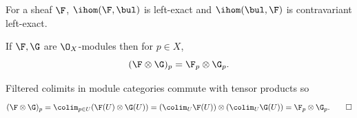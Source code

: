 \eproof

\bcoro

    For a sheaf $\F$, $\ihom(\F,\bul)$ is left-exact and $\ihom(\bul,\F)$ is contravariant left-exact.

\ecoro

\bprop

    If $\F,\G$ are $\O_X$-modules then for $p\in X$,
    $$ (\F\otimes\G)_p = \F_p\otimes\G_p . $$

\eprop

\bproof

    Filtered colimits in module categories commute with tensor products so
    $$ (\F\otimes\G)_p = \colim_{p\in U}(\F(U)\otimes\G(U)) = (\colim_U\F(U))\otimes(\colim_U\G(U))
    = \F_p\otimes\G_p . \qed $$

\eproof

